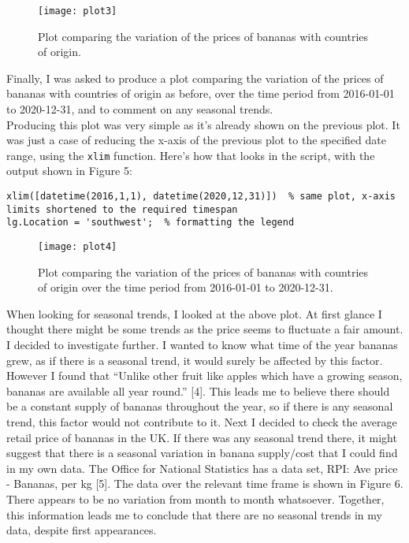 \documentclass[a4paper,12pt]{article}
\begin{document}
\begin{figure}[h]
\centering
\texttt{[image: plot3]}
\caption{Plot comparing the variation of the prices of bananas with countries of origin.}
\end{figure}

Finally, I was asked to produce a plot comparing the variation of the prices of bananas with countries of origin as before, over the time period from 2016-01-01 to 2020-12-31, and to comment on any seasonal trends. \\

Producing this plot was very simple as it's already shown on the previous plot. It was just a case of reducing the x-axis of the previous plot to the specified date range, using the \verb!xlim! function. Here's how that looks in the script, with the output shown in Figure 5:

\begin{lstlisting}
xlim([datetime(2016,1,1), datetime(2020,12,31)])  % same plot, x-axis limits shortened to the required timespan
lg.Location = 'southwest';  % formatting the legend
\end{lstlisting}
\newpage
\begin{figure}[h]
\centering
\texttt{[image: plot4]}
\caption{Plot comparing the variation of the prices of bananas with countries of origin over the time period from 2016-01-01 to 2020-12-31.}
\end{figure}

When looking for seasonal trends, I looked at the above plot. At first glance I thought there might be some trends as the price seems to fluctuate a fair amount. I decided to investigate further. I wanted to know what time of the year bananas grew, as if there is a seasonal trend, it would surely be affected by this factor. However I found that ``Unlike other fruit like apples which have a growing season, bananas are available all year round.'' [4]. This leads me to believe there should be a constant supply of bananas throughout the year, so if there is any seasonal trend, this factor would not contribute to it. Next I decided to check the average retail price of bananas in the UK. If there was any seasonal trend there, it might suggest that there is a seasonal variation in banana supply/cost that I could find in my own data. The Office for National Statistics has a data set, RPI: Ave price - Bananas, per kg [5]. The data over the relevant time frame is shown in Figure 6. There appears to be no variation from month to month whatsoever. Together, this information leads me to conclude that there are no seasonal trends in my data, despite first appearances.
\end{document}
